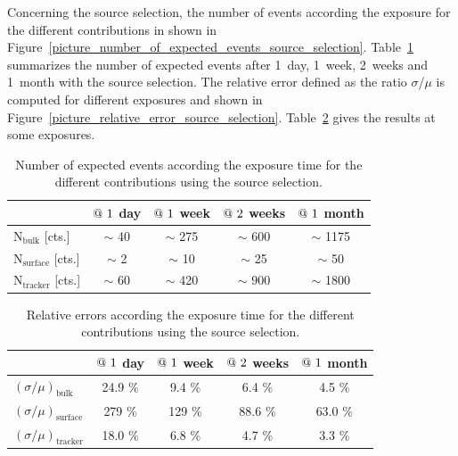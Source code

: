 \documentclass[main.tex]{subfiles}
\begin{document}
\NI Concerning the source selection, the number of events according the exposure for the different contributions in shown in Figure~\ref{picture_number_of_expected_events_source_selection}. Table~\ref{table_number_of_expected_events_source_selection} summarizes the number of expected events after 1~day, 1~week, 2~weeks and 1~month with the source selection. The relative error defined as the ratio $\sigma$/$\mu$ is computed for different exposures and shown in Figure~\ref{picture_relative_error_source_selection}. Table~\ref{table_relative_error_source_selection} gives the results at some exposures.


\begin{table}[h!]
\begin{center}
\begin{tabular}{l|c|c|c|c}
 & $\symbol{64}~1$ day  & $\symbol{64}~1$ week  & $\symbol{64}~2$ weeks & $\symbol{64}~1$ month  \\
\hline
$\text{N}_\text{bulk}$ [cts.]    & $\sim$ 40 & $\sim$ 275  & $\sim$ 600 & $\sim$ 1175 \\
$\text{N}_\text{surface}$ [cts.] & $\sim$ 2  & $\sim$ 10   & $\sim$ 25  & $\sim$ 50   \\
$\text{N}_\text{tracker}$ [cts.] & $\sim$ 60 & $\sim$ 420  & $\sim$ 900 & $\sim$ 1800 \\
\hline
\end{tabular}
\end{center}
\caption{Number of expected events according the exposure time for the different contributions using the source selection.}
\label{table_number_of_expected_events_source_selection}
\end{table}


\begin{table}[h!]
\begin{center}
\begin{tabular}{l|c|c|c|c}
       & $\symbol{64}~1$ day  & $\symbol{64}~1$ week  & $\symbol{64}~2$ weeks & $\symbol{64}~1$ month  \\
\hline
$(\sigma / \mu)_{\text{bulk}}$    & 24.9 \% & 9.4  \% & 6.4  \% & 4.5  \% \\
$(\sigma / \mu)_{\text{surface}}$ & 279  \% & 129  \% & 88.6 \% & 63.0 \% \\
$(\sigma / \mu)_{\text{tracker}}$ & 18.0 \% & 6.8  \% & 4.7  \% & 3.3  \% \\
\hline
\end{tabular}
\end{center}
\caption{Relative errors according the exposure time for the different contributions using the source selection.}
\label{table_relative_error_source_selection}
\end{table}
\end{document}
